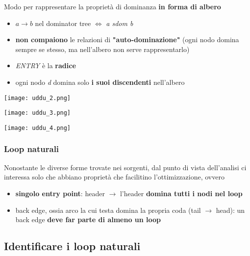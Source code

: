 Modo per rappresentare la propriet\`a di dominanza \textbf{in forma di albero}

\begin{itemize}
  \item $a \rightarrow b$ nel dominator tree $\iff$ \textit{a sdom b}
  \item \textbf{non compaiono} le relazioni di \textbf{"auto-dominazione"} (ogni nodo domina sempre se stesso, ma nell'albero non serve rappresentarlo)
  \item \textit{ENTRY} \`e la \textbf{radice}
  \item ogni nodo \textit{d} domina solo \textbf{i suoi discendenti} nell'albero
\end{itemize}

\begin{example}[frametitle={Esempi di DT}]
   \begin{minipage}[c]{.24\textwidth}
   \texttt{[image: uddu\_2.png]}
   \end{minipage}
   \begin{minipage}[c]{.24\textwidth}
   \texttt{[image: uddu\_3.png]}
   \end{minipage}\hfill\vline\hfill
   \begin{minipage}[c]{.48\textwidth}
   \texttt{[image: uddu\_4.png]}
   \label{example-dt}
   \end{minipage}
\end{example}


\subsubsection{Loop naturali}

Nonostante le diverse forme trovate nei sorgenti, dal punto di vista dell'analisi ci interessa solo che abbiano propriet\`a che facilitino l'ottimizzazione, ovvero
\begin{itemize}
  \item \textbf{singolo entry point}: header $\rightarrow$ l'header \textbf{domina tutti i nodi nel loop}
  \item back edge, ossia arco la cui testa domina la propria coda (tail $\rightarrow$ head): un back edge \textbf{deve far parte di almeno un loop}
\end{itemize}

\subsection{Identificare i loop naturali}

